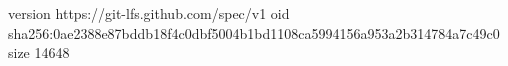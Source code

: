 version https://git-lfs.github.com/spec/v1
oid sha256:0ae2388e87bddb18f4c0dbf5004b1bd1108ca5994156a953a2b314784a7c49c0
size 14648
